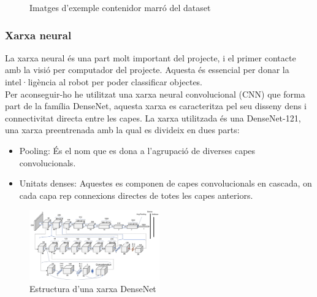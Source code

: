 ﻿\documentclass[10pt,a4paper,twocolumn,twoside]{article}
\begin{document}
\begin{figure} [!h]
\footnotesize
{}
\caption{Imatges d'exemple contenidor marró del dataset}
\end{figure}

 \subsubsection{Xarxa neural}
La xarxa neural és una part molt important del projecte, i el primer contacte amb la visió per computador del projecte. Aquesta és essencial per donar la intel·ligència al robot per poder classificar objectes.
\\

Per aconseguir-ho he utilitzat una xarxa neural convolucional (CNN) que forma part de la família DenseNet, aquesta xarxa es caracteritza pel seu disseny dens i connectivitat directa entre les capes. La xarxa utilitzada és una DenseNet-121, una xarxa preentrenada amb la qual es divideix en dues parts:

\begin{itemize}
  \item Pooling: És el nom que es dona a l'agrupació de diverses capes convolucionals.
  \item Unitats denses: Aquestes es componen de capes convolucionals en cascada, on cada capa rep connexions directes de totes les capes anteriors.
\end{itemize}

\begin{figure}[h]
 \centering
    \includegraphics[width=0.5\textwidth]{img/denseNet.png}
    \caption{Estructura d'una xarxa DenseNet}
\end{figure}
 \hfill \break
\end{document}
